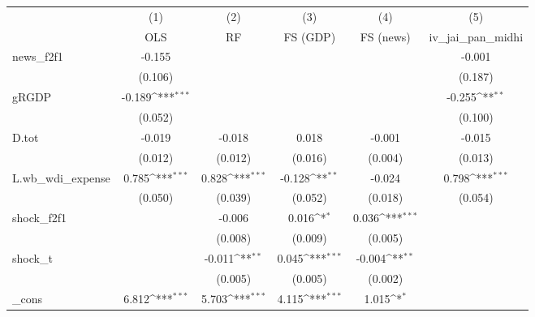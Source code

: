 {
\def\sym#1{\ifmmode^{#1}\else\(^{#1}\)\fi}
\begin{tabular}{l*{5}{c}}
\toprule
            &\multicolumn{1}{c}{(1)}&\multicolumn{1}{c}{(2)}&\multicolumn{1}{c}{(3)}&\multicolumn{1}{c}{(4)}&\multicolumn{1}{c}{(5)}\\
            &\multicolumn{1}{c}{OLS}&\multicolumn{1}{c}{RF}&\multicolumn{1}{c}{FS (GDP)}&\multicolumn{1}{c}{FS (news)}&\multicolumn{1}{c}{iv\_jai\_pan\_midhi}\\
\midrule
news\_f2f1   &      -0.155         &                     &                     &                     &      -0.001         \\
            &     (0.106)         &                     &                     &                     &     (0.187)         \\
\addlinespace
gRGDP       &      -0.189\sym{***}&                     &                     &                     &      -0.255\sym{**} \\
            &     (0.052)         &                     &                     &                     &     (0.100)         \\
\addlinespace
D.tot       &      -0.019         &      -0.018         &       0.018         &      -0.001         &      -0.015         \\
            &     (0.012)         &     (0.012)         &     (0.016)         &     (0.004)         &     (0.013)         \\
\addlinespace
L.wb\_wdi\_expense&       0.785\sym{***}&       0.828\sym{***}&      -0.128\sym{**} &      -0.024         &       0.798\sym{***}\\
            &     (0.050)         &     (0.039)         &     (0.052)         &     (0.018)         &     (0.054)         \\
\addlinespace
shock\_f2f1  &                     &      -0.006         &       0.016\sym{*}  &       0.036\sym{***}&                     \\
            &                     &     (0.008)         &     (0.009)         &     (0.005)         &                     \\
\addlinespace
shock\_t     &                     &      -0.011\sym{**} &       0.045\sym{***}&      -0.004\sym{**} &                     \\
            &                     &     (0.005)         &     (0.005)         &     (0.002)         &                     \\
\addlinespace
\_cons      &       6.812\sym{***}&       5.703\sym{***}&       4.115\sym{***}&       1.015\sym{*}  &                     \\

\end{tabular}}
